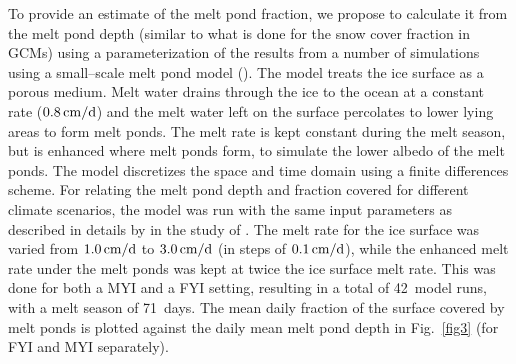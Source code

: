 To provide an estimate of the melt pond fraction, we propose to
calculate it from the melt pond depth (similar to what is done for
the snow cover fraction in GCMs) using a parameterization of the
results from a number of simulations using a small--scale melt pond
model (\cite{luethje2006}). The model treats the ice surface as a
porous medium. Melt water drains through the ice to the ocean at a
constant rate ($0.8\,{\rm cm/d}$) and the melt water left on the
surface percolates to lower lying areas to form melt ponds. The melt
rate is kept constant during the melt season, but is enhanced where
melt ponds form, to simulate the lower albedo of the melt ponds.
The model discretizes the space and time domain using a finite
differences scheme. For relating the melt pond depth and fraction
covered for different climate scenarios, the model was run with the
same input parameters as described in details by \cite{luethje2006} in
the study of \cite{pedersen2009}. The
melt rate for the ice surface was varied from $1.0\,{\rm cm/d}$ to
$3.0\,{\rm cm/d}$ (in steps of $0.1\,{\rm cm/d}$), while the enhanced
melt rate under the melt ponds was kept at twice the ice surface melt
rate. This was done for both a MYI and a FYI setting, resulting in a
total of 42~model runs, with a melt season of 71~days. The mean daily
fraction of the surface covered by melt ponds is plotted against the
daily mean melt pond depth in Fig.~\ref{fig3} (for FYI and MYI separately).

